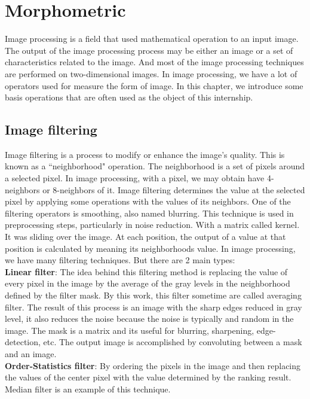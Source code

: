 \chapter{Morphometric}
Image processing is a field that used mathematical operation to an input image. The output of the image processing process may be either an image or a set of characteristics related to the image. And most of the image processing techniques are performed on two-dimensional images. In image processing, we have a lot of operators used for measure the form of image. In this chapter, we introduce some basis operations that are often used as the object of this internship.
\section{Image filtering}
Image filtering is a process to modify or enhance the image's quality. This is known as a ``neighborhood" operation. The neighborhood is a set of pixels around a selected pixel. In image processing, with a pixel, we may obtain have 4-neighbors or 8-neighbors of it. Image filtering determines the value at the selected pixel by applying some operations with the values of its neighbors. One of the filtering operators is smoothing, also named blurring. This technique is used in preprocessing steps, particularly in noise reduction. With a matrix called kernel. It was sliding over the image. At each position, the output of a value at that position is calculated by meaning its neighborhoods value.
In image processing, we have many filtering techniques. But there are 2 main types:\\[0.2cm]
\textbf{Linear filter}: The idea behind this filtering method is replacing the value of every pixel in the image by the average of the gray levels in the neighborhood defined by the filter mask. By this work, this filter sometime are called averaging filter. The result of this process is an image with the sharp edges reduced in gray level, it also reduces the noise because the noise is typically and random in the image. The mask is a matrix and its useful for blurring, sharpening, edge-detection, etc. The output image is accomplished by convoluting between a mask and an image.\\[0.2cm]
\textbf{Order-Statistics filter}: By ordering the pixels in the image and then replacing the values of the center pixel with the value determined by the ranking result. Median filter is an example of this technique.
